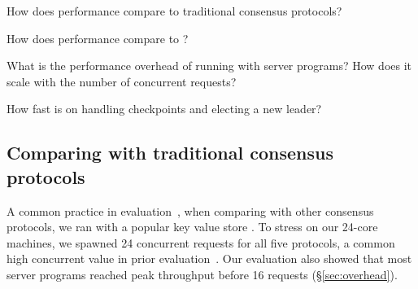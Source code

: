 \begin{tightenum}

\item[\S\ref{sec:eval-traditional}:] How does \xxx performance compare
to traditional consensus protocols?

\item[\S\ref{sec:eval-dare}:] How does \xxx performance compare
to \dare?

\item[\S\ref{sec:overhead}:] What is the performance overhead of running \xxx
with server programs? How does it scale with the number of concurrent 
requests?


\item[\S\ref{sec:robust}:] How fast is \xxx on handling checkpoints and
electing a new leader?



\end{tightenum}





\subsection{Comparing with traditional consensus protocols}
\label{sec:eval-traditional}

A common practice in 
\paxos evaluation~\cite{dare:hpdc15,nopaxos:osdi16}, when comparing \xxx with 
other consensus protocols, we ran \xxx with a popular key value store \redis.  
To stress \xxx on our 24-core machines, we spawned 24 concurrent requests for 
all five protocols, a common high concurrent value in prior 
evaluation~\cite{zookeeper,crane:sosp15,rex:eurosys14}. Our evaluation also 
showed that most server programs reached peak throughput before 16 requests 
(\S\ref{sec:overhead}).


